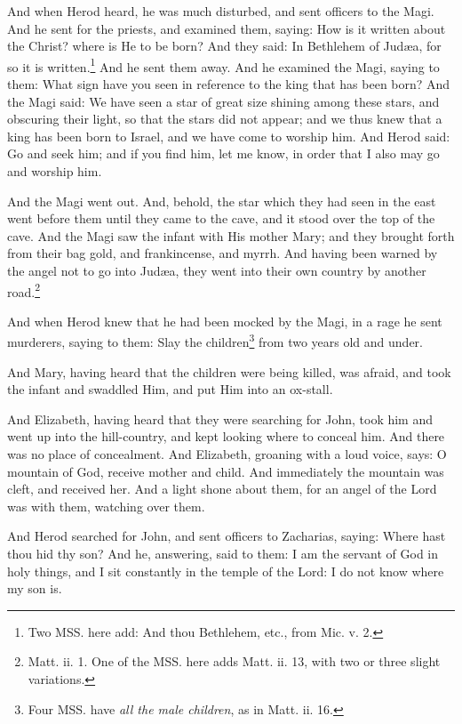 \pend\pstart
And when Herod heard, he was much disturbed, and sent officers to the Magi. And he sent for the priests, and examined them, saying: How is it written about the Christ? where is He to be born? And they said: In Bethlehem of Judæa, for so it is written.\footnote{Two MSS. here add: And thou Bethlehem, etc., from Mic. v. 2.} And he sent them away. And he examined the Magi, saying to them: What sign have you seen in reference to the king that has been born? And the Magi said: We have seen a star of great size shining among these stars, and obscuring their light, so that the stars did not appear; and we thus knew that a king has been born to Israel, and we have come to worship him. And Herod said: Go and seek him; and if you find him, let me know, in order that I also may go and worship him.

\pend\pstart
And the Magi went out. And, behold, the star which they had seen in the east went before them until they came to the cave, and it stood over the top of the cave. And the Magi saw the infant with His mother Mary; and they brought forth from their bag gold, and frankincense, and myrrh. And having been warned by the angel not to go into Judæa, they went into their own country by another road.\footnote{Matt. ii. 1. One of the MSS. here adds Matt. ii. 13, with two or three slight variations.}

\pend\pstart
{}

\pend\pstart
And when Herod knew that he had been mocked by the Magi, in a rage he sent murderers, saying to them: Slay the children\footnote{Four MSS. have \textit{all the male children}, as in Matt. ii. 16.} from two years old and under.

\pend\pstart
And Mary, having heard that the children were being killed, was afraid, and took the infant and swaddled Him, and put Him into an ox-stall.

\pend\pstart
And Elizabeth, having heard that they were searching for John, took him and went up into the hill-country, and kept looking where to conceal him. And there was no place of concealment. And Elizabeth, groaning with a loud voice, says: O mountain of God, receive mother and child. And immediately the mountain was cleft, and received her. And a light shone about them, for an angel of the Lord was with them, watching over them.

\pend\pstart
{}

\pend\pstart
And Herod searched for John, and sent officers to Zacharias, saying: Where hast thou hid thy son? And he, answering, said to them: I am the servant of God in holy things, and I sit constantly in the temple of the Lord: I do not know where my son is.

